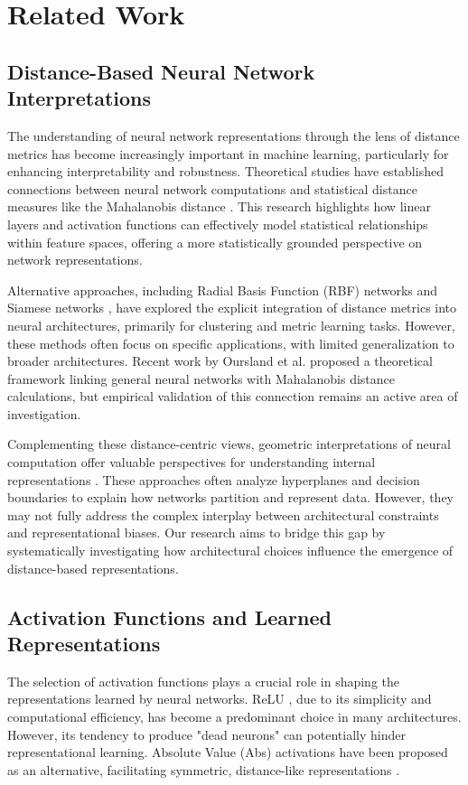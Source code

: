 \section{Related Work}

\subsection{Distance-Based Neural Network Interpretations}
The understanding of neural network representations through the lens of distance metrics has become increasingly important in machine learning, particularly for enhancing interpretability and robustness. Theoretical studies have established connections between neural network computations and statistical distance measures like the Mahalanobis distance \cite{mahalanobis1936, oursland2024interpreting}. This research highlights how linear layers and activation functions can effectively model statistical relationships within feature spaces, offering a more statistically grounded perspective on network representations.

Alternative approaches, including Radial Basis Function (RBF) networks \cite{broomhead1988rbf} and Siamese networks \cite{bromley1994signature}, have explored the explicit integration of distance metrics into neural architectures, primarily for clustering and metric learning tasks. However, these methods often focus on specific applications, with limited generalization to broader architectures. Recent work by Oursland et al. \cite{oursland2024interpreting} proposed a theoretical framework linking general neural networks with Mahalanobis distance calculations, but empirical validation of this connection remains an active area of investigation.

Complementing these distance-centric views, geometric interpretations of neural computation offer valuable perspectives for understanding internal representations \cite{montavon2018methods, samek2019explainable}. These approaches often analyze hyperplanes and decision boundaries to explain how networks partition and represent data. However, they may not fully address the complex interplay between architectural constraints and representational biases. Our research aims to bridge this gap by systematically investigating how architectural choices influence the emergence of distance-based representations.

\subsection{Activation Functions and Learned Representations}
The selection of activation functions plays a crucial role in shaping the representations learned by neural networks. ReLU \cite{nair2010relu}, due to its simplicity and computational efficiency, has become a predominant choice in many architectures. However, its tendency to produce "dead neurons" can potentially hinder representational learning. Absolute Value (Abs) activations have been proposed as an alternative, facilitating symmetric, distance-like representations \cite{oursland2024interpreting}.


